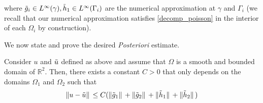 where \(\Tilde{g}_i \in L^\infty(\gamma), \Tilde{h}_1 \in L^\infty(\Gamma_i)\) are the numerical approximation at \(\gamma\) and \(\Gamma_i\) (we recall that our numerical approximation satisfies \eqref{decomp_poisson} in the interior of each \(\Omega_i\) by construction).

We now state and prove the desired \textit{Posteriori} estimate.
\begin{theorem}
    Consider \(u\) and \(\Tilde{u}\) defined as above and assume that \(\Omega\) is a smooth and bounded domain of \(\mathbb{R}^2\). Then, there exists a constant \(C > 0\) that only depends on the domains \(\Omega_1\) and \(\Omega_2\) such that
    \[
    \norm*{u-\Tilde{u}} \leq C(\norm*{\Tilde{g}_1} + \norm*{\Tilde{g}_2} + \norm*{\Tilde{h}_1} + \norm*{\Tilde{h}_2})
    \]
\end{theorem}
